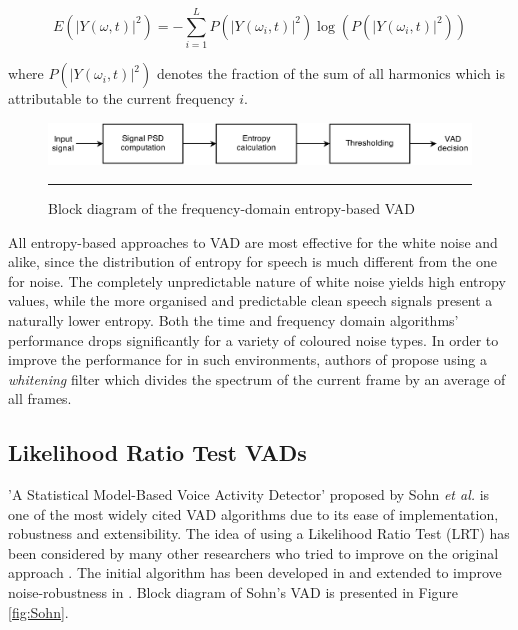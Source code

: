 \begin{equation}
E( \left |  Y \left ( \omega, t \right ) \right |^{2} ) = - \sum_{i=1}^{L} P( \left |  Y \left ( \omega_i, t \right ) \right |^{2} ) \log \left( P( \left |  Y \left ( \omega_i, t \right ) \right |^{2} ) \right)
\end{equation}

where $P( \left |  Y \left ( \omega_i, t \right ) \right |^{2} )$ denotes the fraction of the sum of all harmonics which is attributable to the current frequency $i$.

\begin{figure}[htbp]
	\centering
		\includegraphics[width=0.9\columnwidth]{Figures/Renevey.png}
		\rule{37em}{0.5pt}
	\caption[Block diagram of the frequency-domain entropy-based VAD]{Block diagram of the frequency-domain entropy-based VAD \cite{Renevey}}
	\label{fig:Renevey}
\end{figure}

All entropy-based approaches to VAD are most effective for the white noise and alike, since the distribution of entropy for speech is much different from the one for noise. The completely unpredictable nature of white noise yields high entropy values, while the more organised and predictable clean speech signals present a naturally lower entropy. Both the time and frequency domain algorithms' performance drops significantly for a variety of coloured noise types. In order to improve the performance for in such environments, authors of \cite{Renevey} propose using a \emph{whitening} filter which divides the spectrum of the current frame by an average of all frames.

\subsection{Likelihood Ratio Test VADs}
\label{ssec:LRT}

'A Statistical Model-Based Voice Activity Detector' proposed by Sohn \emph{et al.} \cite{Sohn} is one of the most widely cited VAD algorithms due to its ease of implementation, robustness and extensibility. The idea of using a Likelihood Ratio Test (LRT) has been considered by many other researchers who tried to improve on the original approach \cite{ImprovedLikelihood, Cho}. The initial algorithm has been developed in \cite{SohnInitial} and extended to improve noise-robustness in \citep{Sohn}. Block diagram of Sohn's VAD is presented in Figure \ref{fig:Sohn}.

